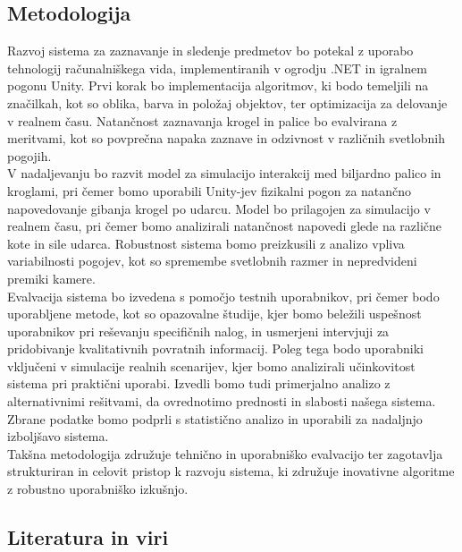 \documentclass[a4paper, 12pt]{article}
\begin{document}
\subsection{Metodologija}
Razvoj sistema za zaznavanje in sledenje predmetov bo potekal z uporabo tehnologij računalniškega vida, implementiranih v ogrodju .NET in igralnem pogonu Unity. Prvi korak bo implementacija algoritmov, ki bodo temeljili na značilkah, kot so oblika, barva in položaj objektov, ter optimizacija za delovanje v realnem času. Natančnost zaznavanja krogel in palice bo evalvirana z meritvami, kot so povprečna napaka zaznave in odzivnost v različnih svetlobnih pogojih.
\\
V nadaljevanju bo razvit model za simulacijo interakcij med biljardno palico in kroglami, pri čemer bomo uporabili Unity-jev fizikalni pogon za natančno napovedovanje gibanja krogel po udarcu. Model bo prilagojen za simulacijo v realnem času, pri čemer bomo analizirali natančnost napovedi glede na različne kote in sile udarca. Robustnost sistema bomo preizkusili z analizo vpliva variabilnosti pogojev, kot so spremembe svetlobnih razmer in nepredvideni premiki kamere.
\\
Evalvacija sistema bo izvedena s pomočjo testnih uporabnikov, pri čemer bodo uporabljene metode, kot so opazovalne študije, kjer bomo beležili uspešnost uporabnikov pri reševanju specifičnih nalog, in usmerjeni intervjuji za pridobivanje kvalitativnih povratnih informacij. Poleg tega bodo uporabniki vključeni v simulacije realnih scenarijev, kjer bomo analizirali učinkovitost sistema pri praktični uporabi. Izvedli bomo tudi primerjalno analizo z alternativnimi rešitvami, da ovrednotimo prednosti in slabosti našega sistema. Zbrane podatke bomo podprli s statistično analizo in uporabili za nadaljnjo izboljšavo sistema.
\\
Takšna metodologija združuje tehnično in uporabniško evalvacijo ter zagotavlja strukturiran in celovit pristop k razvoju sistema, ki združuje inovativne algoritme z robustno uporabniško izkušnjo.

\subsection{Literatura in viri}
\label{literatura}
\renewcommand\refname{}
\vspace{-50px}


\end{document}
